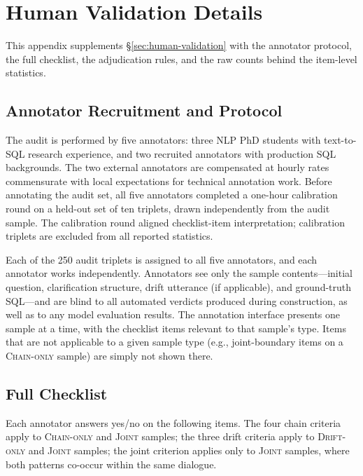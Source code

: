 \section{Human Validation Details}
\label{app:validation}

This appendix supplements \S\ref{sec:human-validation} with the annotator protocol, the full checklist, the adjudication rules, and the raw counts behind the item-level statistics.

\subsection{Annotator Recruitment and Protocol}
\label{app:validation-annotators}

The audit is performed by five annotators: three NLP PhD students with text-to-SQL research experience, and two recruited annotators with production SQL backgrounds. The two external annotators are compensated at hourly rates commensurate with local expectations for technical annotation work. Before annotating the audit set, all five annotators completed a one-hour calibration round on a held-out set of ten triplets, drawn independently from the audit sample. The calibration
round aligned checklist-item interpretation; calibration triplets are excluded from all reported statistics.

Each of the 250 audit triplets is assigned to all five annotators, and each annotator works independently. Annotators see only the sample contents---initial question, clarification structure, drift utterance (if applicable), and ground-truth SQL---and are blind to all automated verdicts produced during construction, as well as to any model evaluation results. The annotation interface presents one sample at a time, with the checklist items relevant to that sample's type. Items that are not applicable to a given sample type (e.g., joint-boundary items on a \textsc{Chain-only} sample) are simply not shown there.

\subsection{Full Checklist}
\label{app:validation-checklist}

Each annotator answers yes/no on the following items. The four chain criteria apply to \textsc{Chain-only} and \textsc{Joint} samples; the three drift criteria apply to \textsc{Drift-only} and \textsc{Joint} samples; the joint criterion applies only to \textsc{Joint} samples, where both patterns co-occur within the same dialogue.

